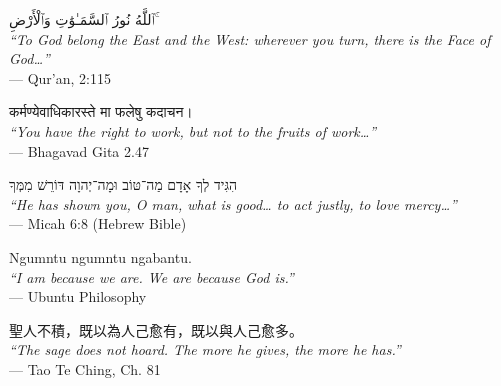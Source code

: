 \documentclass[12pt]{article}
\begin{document}
\begin{center}
\textarabic{ٱللَّهُ نُورُ ٱلسَّمَـٰوَٰتِ وَٱلْأَرْضِ ۚ} \\
\textit{“To God belong the East and the West: wherever you turn, there is the Face of God…”} \\
— Qur’an, 2:115

\vspace{1em}
कर्मण्येवाधिकारस्ते मा फलेषु कदाचन। \\
\textit{“You have the right to work, but not to the fruits of work…”} \\
— Bhagavad Gita 2.47

\vspace{1em}
הִגִּיד לְךָ אָדָם מַה־טּוֹב וּמָה־יְהוָה דּוֹרֵשׁ מִמְּךָ \\
\textit{“He has shown you, O man, what is good… to act justly, to love mercy…”} \\
— Micah 6:8 (Hebrew Bible)

\vspace{1em}
Ngumntu ngumntu ngabantu. \\
\textit{“I am because we are. We are because God is.”} \\
— Ubuntu Philosophy

\vspace{1em}
聖人不積，既以為人己愈有，既以與人己愈多。 \\
\textit{“The sage does not hoard. The more he gives, the more he has.”} \\
— Tao Te Ching, Ch. 81
\end{center}
\end{document}
